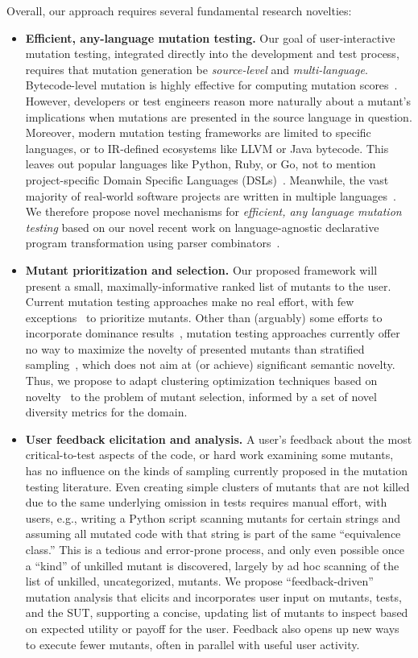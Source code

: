 Overall, our approach requires several fundamental research novelties:
\begin{itemize}[labelsep=3pt,leftmargin=12pt]
\item \textbf{Efficient, any-language mutation testing.}
Our goal of user-interactive mutation testing, integrated directly into
the development and test process, requires that mutation generation be
\emph{source-level} and \emph{multi-language}.
Bytecode-level mutation is highly effective for computing
mutation scores~\cite{pittest,HaririLLVM}.  However, developers or test
engineers reason more naturally about a mutant's implications when mutations
are presented in the source language in question.  Moreover, modern mutation
testing frameworks are limited to specific languages, or to IR-defined
ecosystems like LLVM or Java bytecode.  This leaves out popular languages like Python, Ruby, or Go, not
to mention project-specific Domain Specific Languages (DSLs)~\cite{Fow10}.
Meanwhile, the vast majority of
real-world software projects are written in multiple languages~\cite{Ray2014}.
We therefore propose novel mechanisms for \emph{efficient, any language mutation
  testing} based on our novel recent work on language-agnostic declarative
program transformation using parser combinators~\cite{rvt-ppc}.
\item \textbf{Mutant prioritization and selection.}  Our
  proposed framework will present a small, maximally-informative ranked list of
  mutants to the user.
Current mutation testing approaches make
no real effort, with few exceptions~\cite{MutGoogle,FaRM} to prioritize mutants.
Other than (arguably) some efforts to
incorporate dominance results~\cite{MutQuality}, mutation testing approaches
currently offer no way to maximize the novelty of presented
mutants than stratified sampling~\cite{gopinath2017mutation}, which
does not aim at (or achieve) significant semantic novelty.  Thus,
we propose to adapt clustering optimization techniques based on 
novelty~\cite{Gonzalez85} to the problem of mutant selection, informed by a set
of novel diversity metrics for the domain.
\item \textbf{User feedback elicitation and analysis.}
A
user's feedback about the most critical-to-test aspects of the code, or hard
work examining some mutants, has no influence on the kinds of sampling currently
proposed in the mutation testing literature.
Even creating simple clusters of
mutants that are not killed due to the same underlying omission in tests
requires manual effort, with users, e.g., writing a Python script scanning
mutants for certain strings and assuming all mutated code with that string is
part of the same ``equivalence class.''  This is a tedious and error-prone
process, and only even possible once a ``kind'' of unkilled mutant is
discovered, largely by ad hoc scanning of the list of unkilled, uncategorized,
mutants.
We propose ``feedback-driven'' mutation analysis that elicits and incorporates
user input on mutants, tests, and the SUT, supporting a concise, updating list
of mutants to inspect based on expected utility or payoff for the
user.  Feedback also opens up new ways to execute fewer mutants, 
often in parallel with useful user activity.
\end{itemize}

